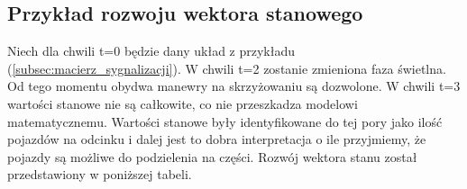 \documentclass[12pt]{book}
\theoremstyle{plain}
\newcommand{\myref}[1]{(\ref{#1})}
\begin{document}
\subsection{Przykład rozwoju wektora stanowego}
Niech dla chwili t=0 będzie dany układ z przykładu \myref{subsec:macierz_sygnalizacji}. W chwili t=2 zostanie zmieniona faza świetlna. Od tego momentu obydwa manewry na skrzyżowaniu są dozwolone.  W chwili t=3 wartości stanowe nie są całkowite, co nie przeszkadza modelowi matematycznemu. Wartości stanowe były identyfikowane do tej pory jako ilość pojazdów na odcinku i dalej jest to dobra interpretacja o ile przyjmiemy, że pojazdy są możliwe do podzielenia na części. Rozwój wektora stanu został przedstawiony w poniższej tabeli.

\def \xzero{\begin{bmatrix}
		9 \\ 4 \\ 3 \\ 0 \\ 1 \\ 5
\end{bmatrix}}
\def \xI{\begin{bmatrix}
		0 \\ 12 \\ 1 \\ 3 \\ 0 \\ 1
\end{bmatrix}}
\def \xII{\begin{bmatrix}
		0 \\ 9 \\ 3 \\ 1 \\ 0 \\ 0
\end{bmatrix}}
\def \xIII{\begin{bmatrix}
		0 \\ 0 \\ 2 \frac{1}{4} \\ 3 \\ 7 \frac{3}{4} \\ 0
\end{bmatrix}}

\def \AZero{
	\begin{bmatrix}
		0 & 0            & 0 & 0 & 0 & 0 \\
		1 & \frac{3}{4}  & 0 & 0 & 0 & 0 \\
		0 & \frac{1}{4}  & 0 & 0 & 0 & 0 \\
		0 & 0            & 1 & 0 & 0 & 0 & \\
		0 & 0            & 0 & 0 & 0 & 0 \\
		0 & 0            & 0 & 0 & 1 & 0 \\
	\end{bmatrix}	
}
\end{document}

